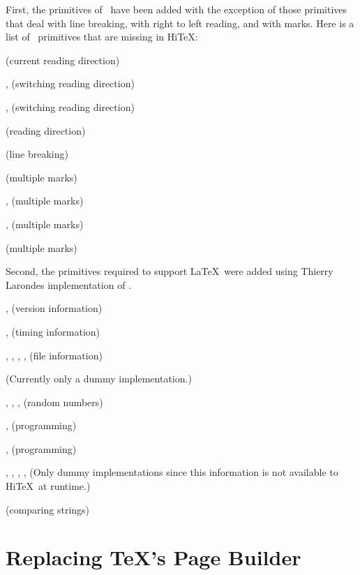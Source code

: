First, the primitives of \eTeX\ have been
added with the exception of those primitives that deal with
line breaking, with right to left reading, and with marks. 
Here is a list of \eTeX\ primitives that are missing in Hi\TeX:
\itemize
\item{} (current reading direction)
\item{},   (switching reading direction)
\item{},  (switching reading direction)
\item{}  (reading direction)
\item{}  (line breaking)
\item{}  (multiple marks)
\item{},    (multiple marks)
\item{},   (multiple marks)
\item{}  (multiple marks)
\enditemize 

Second, the primitives required to support
\LaTeX\ were added using Thierry Larondes implementation of \Prote.

\itemize
\item{},  (version information)
\item{},  (timing information)
\item{}, , ,
     ,  (file information)
\item{} (Currently only a dummy implementation.)
\item{}, ,
     ,  (random numbers)
\item{},  (programming)
\item{},   (programming)
\item{}, , , ,
      (Only dummy implementations since this information
      is not available to Hi\TeX\ at runtime.)
\item{} (comparing strings)
\enditemize 



\section{Replacing \TeX's Page Builder}\label{build}

